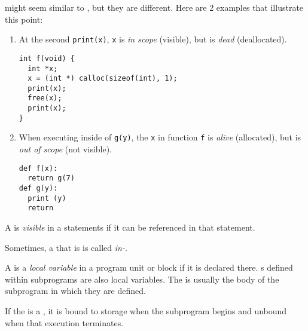  might seem similar to , but they are different.
Here are 2 examples that illustrate this point:
\begin{enumerate}[noitemsep]
\item At the second \texttt{print(x)}, \texttt{x} is \emph{in scope} (visible), but is \emph{dead} (deallocated).
\begin{verbatim}
int f(void) {
  int *x;
  x = (int *) calloc(sizeof(int), 1);
  print(x);
  free(x);
  print(x);
}
\end{verbatim}
  
\item When executing inside of \texttt{g(y)}, the \texttt{x} in function \texttt{f} is \emph{alive} (allocated), but is \emph{out of scope} (not visible).
\begin{verbatim}
def f(x):
  return g(7)
def g(y):
  print (y)
  return
\end{verbatim}
\end{enumerate}

\begin{definition}[Visible]\label{def:Visible_Variable}
  A  is \emph{visible} in a statements if it can be referenced in that statement.

  \begin{remark}[In-Scope]\label{rmk:In_Scope_Variable}
    Sometimes, a  that is  is called \emph{in-}.
  \end{remark}
\end{definition}

\begin{definition}\label{def:Local_Variable}
  A  is a \emph{local variable} in a program unit or block if it is declared there.
  s defined within subprograms are also local variables.
  The  is usually the body of the subprogram in which they are defined.

  \begin{remark}
    If the  is a , it is bound to storage when the subprogram begins and unbound when that execution terminates.
  \end{remark}
\end{definition}

